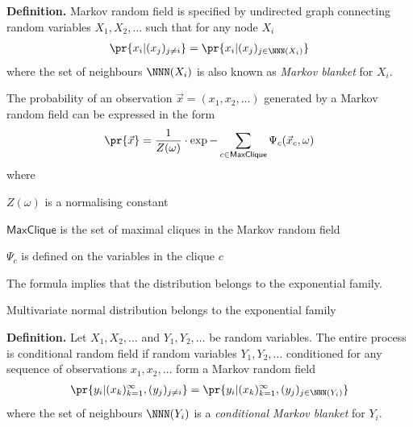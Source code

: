 \documentclass[landscape,footrule]{foils}
\begin{document}


\textbf{Definition.}
Markov random field is specified by undirected graph connecting random variables $X_1,X_2,\ldots$ such that for any node $X_i$ 
\begin{align*}
\pr{x_i|(x_j)_{j\neq i}}=\pr{x_i| (x_j)_{j\in\NNN(X_i)} }
\end{align*}
where the set of neighbours $\NNN(X_i)$ is also known as \emph{Markov blanket} for $X_i$. 



The probability of an observation $\vec{x}=(x_1,x_2,\ldots)$ generated by a Markov random field can be expressed in the form 
\begin{align*}
\pr{\vec{x}}=\frac{1}{Z(\omega)}\cdot\exp{-\sum_{c\in\textsf{MaxClique}}\Psi_c(\vec{x}_c,\omega)} 
\end{align*}  
where
\begin{triangles}
\item $Z(\omega)$ is a normalising constant
\item $\textsf{MaxClique}$ is the set of maximal cliques in the Markov random field
\item $\Psi_c$ is defined on the variables in the clique $c$ 
\end{triangles}
\vspace*{2ex}

The formula implies that the distribution belongs to the exponential family.

\begin{triangles}
\item Multivariate normal distribution belongs to the exponential family
\end{triangles}




\textbf{Definition.}
Let $X_1,X_2,\ldots$ and $Y_1,Y_2,\ldots$ be random variables. The entire process is conditional random field if random variables $Y_1,Y_2,\ldots$ conditioned for any sequence of observations $x_1,x_2,\ldots$ form a Markov random field
\begin{align*}
\pr{y_i|(x_k)_{k=1}^\infty, (y_j)_{j\neq i}}=\pr{y_i|(x_k)_{k=1}^\infty, (y_j)_{j\in\NNN(Y_i)} }
\end{align*}
where the set of neighbours $\NNN(Y_i)$ is a \emph{conditional Markov blanket} for $Y_i$. 
\end{document}
